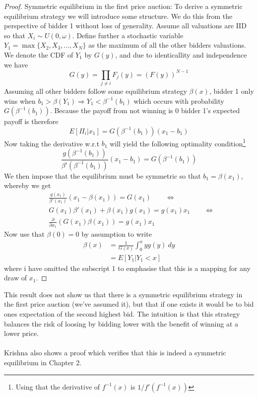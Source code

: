 \begin{proof}{Symmetric equilibrium in the first price auction:}
To derive a symmetric equilibrium strategy we will introduce some structure. We do this from the perspective of bidder 1 without loss of generality. Assume all valuations are IID so that $X_i \sim U(0,\omega)$. Define further a stochastic variable $Y_1=\max\{X_2,X_3,...,X_{N}\}$ as the maximum of all the other bidders valuations. We denote the CDF of $Y_1$ by $G(y)$, and due to identicallity and independence we have
\begin{equation}
  G(y) = \prod_{j \neq i} F_j(y) = (F(y))^{N-1}
\end{equation}
Assuming all other bidders follow some equilibrium strategy $\beta(x)$, bidder 1 only wins when $b_1 > \beta(Y_1) \Rightarrow Y_1 < \beta^{-1}(b_1)$ which occurs with probability $G(\beta^{-1}(b_1))$. Because the payoff from not winning is 0 bidder 1's expected payoff is therefore
\begin{equation}
  E[\Pi_i|x_1] = G(\beta^{-1}(b_1))(x_1 - b_1)
\end{equation}
Now taking the derivative w.r.t $b_1$ will yield the following optimality condition\footnote{Using that the derivative of $f^{-1}(x)$ is $1/f'(f^{-1}(x))$}
\begin{equation}
  \frac{g(\beta^{-1}(b_1))}{\beta'(\beta^{-1}(b_1))}(x_1 - b_1) = G(\beta^{-1}(b_1))
\end{equation}
We then impose that the equilibrium must be symmetric so that $b_1 = \beta(x_1)$, whereby we get
\begin{equation}
  \begin{split}
  &\frac{g(x_1)}{\beta'(x_1)}(x_1-\beta(x_1)) = G(x_1) \qquad   \Leftrightarrow \\
  &G(x_1) \beta'(x_1) + \beta(x_1)g(x_1) = g(x_1)x_1   \qquad \Leftrightarrow \\
  & \frac{\partial}{\partial x_1}(G(x_1) \beta(x_1)) = g(x_1) x_1
\end{split}
\end{equation}
Now use that $\beta(0)=0$ by assumption to write
\begin{equation}
  \begin{split}
  \beta(x) &= \frac{1}{G(x)} \int_0^{x} y g(y) \ dy \\
  &=E[Y_1 | Y_1 < x]
\end{split}
\end{equation}
where i have omitted the subscript 1 to emphasise that this is a mapping for any draw of $x_1$.
\end{proof}
This result does not show us that there is a symmetric equilibrium strategy in the first price auction (we've assumed it), but that if one exists it would be to bid ones expectation of the second highest bid. The intuition is that this strategy balances the risk of loosing by bidding lower with the benefit of winning at a lower price.
\\ \\
Krishna also shows a proof which verifies that this is indeed a symmetric equilibrium in Chapter 2.

